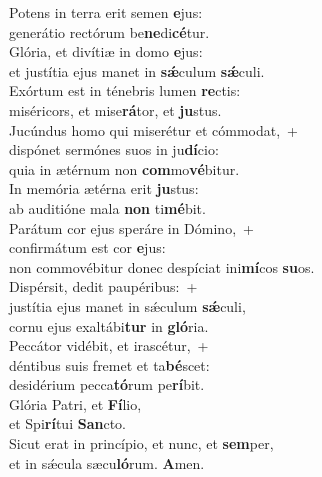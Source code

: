 \evenverse Potens in terra erit semen \textbf{e}jus:~\*\\
\evenverse generátio rectórum be\textbf{ne}di\textbf{cé}tur.\\
\oddverse Glória, et divítiæ in domo \textbf{e}jus:~\*\\
\oddverse et justítia ejus manet in \textbf{sǽ}culum \textbf{sǽ}culi.\\
\evenverse Exórtum est in ténebris lumen \textbf{re}ctis:~\*\\
\evenverse miséricors, et mise\textbf{rá}tor, et \textbf{ju}stus.\\
\oddverse Jucúndus homo qui miserétur et cómmodat,~+\\
\oddverse  dispónet sermónes suos in ju\textbf{dí}cio:~\*\\
\oddverse quia in ætérnum non \textbf{com}mo\textbf{vé}bitur.\\
\evenverse In memória ætérna erit \textbf{ju}stus:~\*\\
\evenverse ab auditióne mala \textbf{non} ti\textbf{mé}bit.\\
\oddverse Parátum cor ejus speráre in Dómino,~+\\
\oddverse  confirmátum est cor \textbf{e}jus:~\*\\
\oddverse non commovébitur donec despíciat ini\textbf{mí}cos \textbf{su}os.\\
\evenverse Dispérsit, dedit paupéribus:~+\\
\evenverse  justítia ejus manet in sǽculum \textbf{sǽ}culi,~\*\\
\evenverse cornu ejus exaltábi\textbf{tur} in \textbf{gló}ria.\\
\oddverse Peccátor vidébit, et irascétur,~+\\
\oddverse  déntibus suis fremet et ta\textbf{bé}scet:~\*\\
\oddverse desidérium pecca\textbf{tó}rum pe\textbf{rí}bit.\\
\evenverse Glória Patri, et \textbf{Fí}lio,~\*\\
\evenverse et Spi\textbf{rí}tui \textbf{San}cto.\\
\oddverse Sicut erat in princípio, et nunc, et \textbf{sem}per,~\*\\
\oddverse et in sǽcula sæcu\textbf{ló}rum. \textbf{A}men.\\
